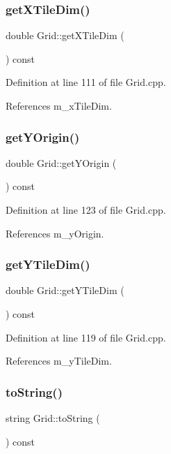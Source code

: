 \subsubsection{get\+X\+Tile\+Dim()}
{\footnotesize\ttfamily double Grid\+::get\+X\+Tile\+Dim (\begin{DoxyParamCaption}{ }\end{DoxyParamCaption}) const}



Definition at line 111 of file Grid.\+cpp.



References m\+\_\+x\+Tile\+Dim.

\mbox{\label{class_grid_a53141770920cf261579cf164a8909af9}} 
\subsubsection{get\+Y\+Origin()}
{\footnotesize\ttfamily double Grid\+::get\+Y\+Origin (\begin{DoxyParamCaption}{ }\end{DoxyParamCaption}) const}



Definition at line 123 of file Grid.\+cpp.



References m\+\_\+y\+Origin.

\mbox{\label{class_grid_aedfe477f5be79a375bd64a4d21765918}} 
\subsubsection{get\+Y\+Tile\+Dim()}
{\footnotesize\ttfamily double Grid\+::get\+Y\+Tile\+Dim (\begin{DoxyParamCaption}{ }\end{DoxyParamCaption}) const}



Definition at line 119 of file Grid.\+cpp.



References m\+\_\+y\+Tile\+Dim.

\mbox{\label{class_grid_ad48d195b5e333a94a3a14d6395252b2a}} 
\subsubsection{to\+String()}
{\footnotesize\ttfamily string Grid\+::to\+String (\begin{DoxyParamCaption}{ }\end{DoxyParamCaption}) const}



